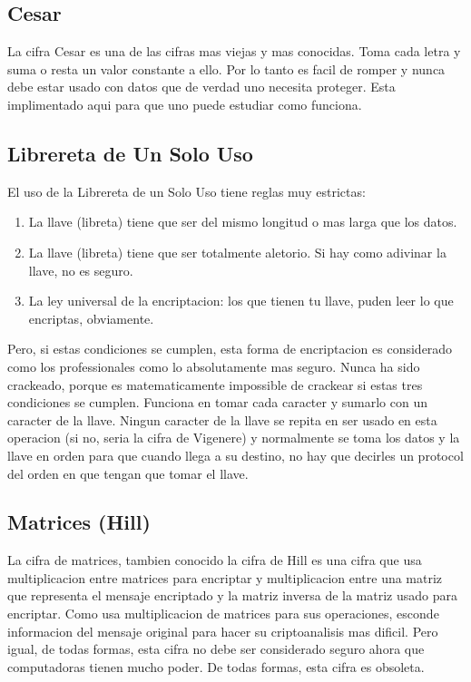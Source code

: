 \documentclass{article}
\begin{document}
		\subsection{Cesar}
			La cifra Cesar es una de las cifras mas viejas y mas conocidas. Toma cada letra y suma o resta un valor constante a ello. Por lo tanto es facil de romper y nunca debe estar usado con datos que de verdad uno necesita proteger. Esta implimentado aqui para que uno puede estudiar como funciona.
		\subsection{Librereta de Un Solo Uso}
			El uso de la Librereta de un Solo Uso tiene reglas muy estrictas:
			\begin{enumerate}  
				\item La llave (libreta) tiene que ser del mismo longitud o mas larga que los datos.
				\item La llave (libreta) tiene que ser totalmente aletorio. Si hay como adivinar la llave, no es seguro.
				\item La ley universal de la encriptacion: los que tienen tu llave, puden leer lo que encriptas, obviamente.
			\end{enumerate}  
			Pero, si estas condiciones se cumplen, esta forma de encriptacion es considerado como los professionales como lo absolutamente mas seguro. Nunca ha sido crackeado, porque es matematicamente impossible de crackear si estas tres condiciones se cumplen. Funciona en tomar cada caracter y sumarlo con un caracter de la llave. Ningun caracter de la llave se repita en ser usado en esta operacion (si no, seria la cifra de Vigenere) y normalmente se toma los datos y la llave en orden para que cuando llega a su destino, no hay que decirles un protocol del orden en que tengan que tomar el llave.
		\subsection{Matrices (Hill)}
			La cifra de matrices, tambien conocido la cifra de Hill es una cifra que usa multiplicacion entre matrices para encriptar y multiplicacion entre una matriz que representa el mensaje encriptado y la matriz inversa de la matriz usado para encriptar. Como usa multiplicacion de matrices para sus operaciones, esconde informacion del mensaje original para hacer su criptoanalisis mas dificil. Pero igual, de todas formas, esta cifra no debe ser considerado seguro ahora que computadoras tienen mucho poder. De todas formas, esta cifra es obsoleta.
\end{document}
